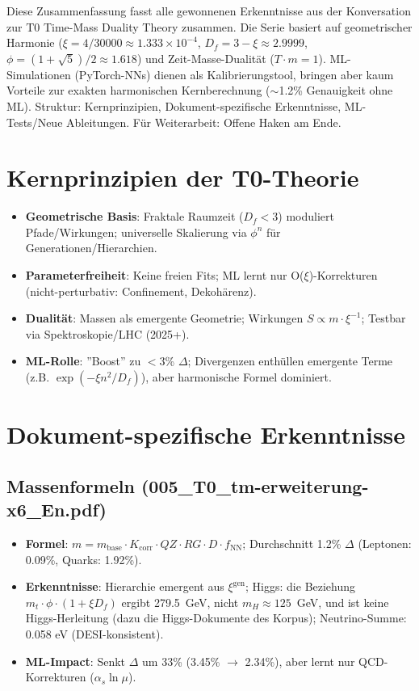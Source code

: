 Diese Zusammenfassung fasst alle gewonnenen Erkenntnisse aus der Konversation zur T0 Time-Mass Duality Theory zusammen. Die Serie basiert auf geometrischer Harmonie ($\xi = 4/30000 \approx 1.333\times10^{-4}$, $D_f = 3 - \xi \approx 2.9999$, $\phi = (1+\sqrt{5})/2 \approx 1.618$) und Zeit-Masse-Dualität ($T \cdot m = 1$). ML-Simulationen (PyTorch-NNs) dienen als Kalibrierungstool, bringen aber kaum Vorteile zur exakten harmonischen Kernberechnung ($\sim$1.2\% Genauigkeit ohne ML). Struktur: Kernprinzipien, Dokument-spezifische Erkenntnisse, ML-Tests/Neue Ableitungen. Für Weiterarbeit: Offene Haken am Ende.
	
	\section{Kernprinzipien der T0-Theorie}
	
	\begin{itemize}
		\item \textbf{Geometrische Basis}: Fraktale Raumzeit ($D_f < 3$) moduliert Pfade/Wirkungen; universelle Skalierung via $\phi^n$ für Generationen/Hierarchien.
		\item \textbf{Parameterfreiheit}: Keine freien Fits; ML lernt nur O($\xi$)-Korrekturen (nicht-perturbativ: Confinement, Dekohärenz).
		\item \textbf{Dualität}: Massen als emergente Geometrie; Wirkungen $S \propto m \cdot \xi^{-1}$; Testbar via Spektroskopie/LHC (2025+).
		\item \textbf{ML-Rolle}: ''Boost'' zu $<$3\% $\Delta$; Divergenzen enthüllen emergente Terme (z.B. $\exp(-\xi n^2 / D_f)$), aber harmonische Formel dominiert.
	\end{itemize}
	
	\section{Dokument-spezifische Erkenntnisse}
	
	\subsection{Massenformeln (005\_T0\_tm-erweiterung-x6\_En.pdf)}
	
	\begin{itemize}
		\item \textbf{Formel}: $m = m_\text{base} \cdot K_\text{corr} \cdot QZ \cdot RG \cdot D \cdot f_\text{NN}$; Durchschnitt 1.2\% $\Delta$ (Leptonen: 0.09\%, Quarks: 1.92\%).
		\item \textbf{Erkenntnisse}: Hierarchie emergent aus $\xi^\text{gen}$; Higgs: die Beziehung $m_t \cdot \phi \cdot (1 + \xi D_f)$ ergibt 279.5~GeV, nicht $m_H \approx 125$~GeV, und ist keine Higgs-Herleitung (dazu die Higgs-Dokumente des Korpus); Neutrino-Summe: 0.058 eV (DESI-konsistent).
		\item \textbf{ML-Impact}: Senkt $\Delta$ um 33\% (3.45\% $\to$ 2.34\%), aber lernt nur QCD-Korrekturen ($\alpha_s \ln \mu$).
	\end{itemize}
	
